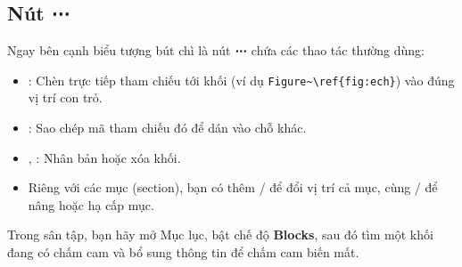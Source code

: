 \subsection{Nút ⋯}
Ngay bên cạnh biểu tượng bút chì là nút \textbf{⋯} chứa các thao tác thường
dùng:
\begin{itemize}
  \item {}: Chèn trực tiếp tham chiếu tới
    khối (ví dụ \texttt{Figure\textasciitilde\textbackslash ref\{fig:ech\}})
    vào đúng vị trí con trỏ.
  \item {}: Sao chép mã tham chiếu đó để dán vào chỗ khác.
  \item {}, : Nhân bản hoặc xóa khối.
  \item Riêng với các mục (section), bạn có thêm  /  để đổi vị trí cả mục, cùng  /  để nâng hoặc
    hạ cấp mục.
\end{itemize}

\begin{thuchanh}
Trong sân tập, bạn hãy mở Mục lục, bật chế độ \textbf{Blocks}, sau đó tìm một
khối đang có chấm cam và bổ sung thông tin để chấm cam biến mất.
\end{thuchanh}